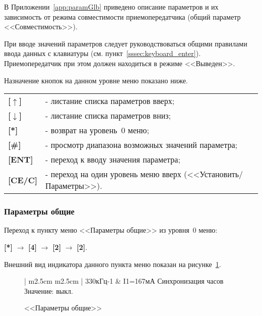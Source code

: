 В Приложении~\ref{app:paramGlb} приведено описание параметров и их зависимость от режима совместимости приемопередатчика (общий параметр <<Совместимость>>).

При вводе значений параметров следует руководствоваться общими правилами ввода данных с клавиатуры (см. пункт~\ref{sssec:keyboard_enter}). Приемопередатчик при этом должен находиться в режиме <<Выведен>>.

Назначение кнопок на данном уровне меню показано ниже.
\begin{center}
	\begin{tabular}{p{2cm} p{15cm}}
		\textbf{[$\uparrow$]}  	& - листание списка параметров вверх; \tabularnewline
		\textbf{[$\downarrow$]} & - листание списка параметров вниз; \tabularnewline
		\textbf{[*]} 			& - возврат на уровень~0 меню; \tabularnewline
		\textbf{[\#]} 			& - просмотр диапазона возможных значений параметра; \tabularnewline
		\textbf{[ENT]} 			& - переход к вводу значения параметра; \tabularnewline
		\textbf{[CE/C]} 		& - переход на один уровень меню вверх (<<Установить/Параметры>>). \tabularnewline				
	\end{tabular}
\end{center} 


\subsubsection{Параметры общие} \label{sssec:setup_param_glb}

Переход к пункту меню <<Параметры общие>> из уровня~0 меню:

\textbf{[*]} $\rightarrow$ \textbf{[4]} $\rightarrow$ \textbf{[2]} $\rightarrow$ \textbf{[2]}.

Внешний вид индикатора данного пункта меню показан на рисунке~\ref{fig:setup_param_glb}.
 
\begin{figure}[H]
	\centering
	
	\begin{tabular}{| m{2.5cm}  m{2.5cm} |}
		\firsthline
		330кГц-1	& \raggedleft I1=167мА		\tabularnewline 
		 {Синхронизация часов}	\tabularnewline
		 {Значение: выкл.} 	\tabularnewline 
		 {}					\tabularnewline 
		\lasthline
	\end{tabular} 
	
	\caption{<<Параметры общие>>}
	\label{fig:setup_param_glb}
\end{figure}


